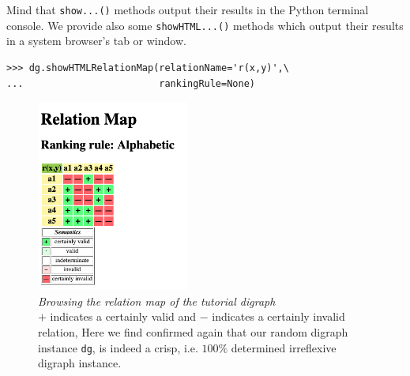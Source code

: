 Mind that \texttt{show...()} methods output their results in the Python terminal console. We provide also some \texttt{showHTML...()} methods which output their results in a system browser’s tab or window.
\begin{lstlisting}
>>> dg.showHTMLRelationMap(relationName='r(x,y)',\
...                        rankingRule=None)
\end{lstlisting}
\begin{figure}[ht]
\sidecaption[t]
\includegraphics[width=5cm]{Figures/1-2-relationMap1.png}
\caption[Browsing the relation map of the tutorial digraph]{\emph{Browsing the relation map of the tutorial digraph}\\ $+$ indicates a certainly valid and $-$ indicates a certainly  invalid relation, Here we find confirmed again that our random digraph instance \texttt{dg}, is indeed a crisp, i.e. $100\%$ determined irreflexive digraph instance.}
\label{fig:1.2}       %
\end{figure}


